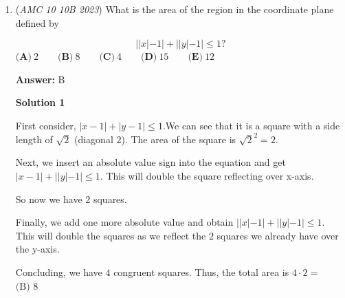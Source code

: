 \begin{enumerate}
 Sketching the graph and noting the multiplicity of the roots, we see that there are $\boxed{C) 6}$ positive intervals.

 



\textbf{Solution 6: Solution 3 with powers}

When the range of \( P(x) \) is from \( -\infty \) to \( 1 \), the sign is negative because in  

 $(x - 1)^1 (x - 2)^2 (x - 3)^3 \cdots (x - 10)^{10}$,the terms corresponding to \( x = 1, 3, 5, 7, \) and \( 9 \) are all negative, and since they have odd exponents, they contribute a negative sign.  The other terms with even exponents (like \( (x - 2)^2 \), \( (x - 4)^4 \), etc.) are positive regardless of the sign inside, so they don't affect the overall sign. However, in the range\( \ 1 \) to \( \ 2 \), the power of $1$ flips, causing this range to be positive. For the range $2$ - $3$, the sign of any even inside the exponent doesn't matter, so this range stays positive. Continueing this pattern, We see the pattern is $+, +, -, -,$ and so on. there are 3 complete cycles, so $3 * 2 =$ $\boxed{\textbf{(C) 6}}$~BlueKite

 


	\item (\textit{AMC 10 10B 2023}) What is the area of the region in the coordinate plane defined by


 
 \[| | x | - 1 | + | | y | - 1 | \le 1?\]
$\textbf{(A)}\ 2 \qquad \textbf{(B)}\ 8 \qquad \textbf{(C)}\ 4 \qquad \textbf{(D)}\ 15 \qquad \textbf{(E)}\ 12$

 \textbf{Answer: }B



\textbf{Solution 1}

First consider, $|x-1|+|y-1| \le 1.$We can see that it is a square with a side length of $\sqrt{2}$ (diagonal $2$). The area of the square is $\sqrt{2}^2 = 2.$

 Next, we insert an absolute value sign into the equation and get $|x-1|+||y|-1| \le 1.$ This will double the square reflecting over x-axis.

 So now we have $2$ squares.

 Finally, we add one more absolute value and obtain $||x|-1|+||y|-1| \le 1.$ This will double the squares as we reflect the $2$ squares we already have over the y-axis.

 Concluding, we have $4$ congruent squares. Thus, the total area is $4\cdot2 =$ $\boxed{\text{(B) 8}}$





\end{enumerate}
